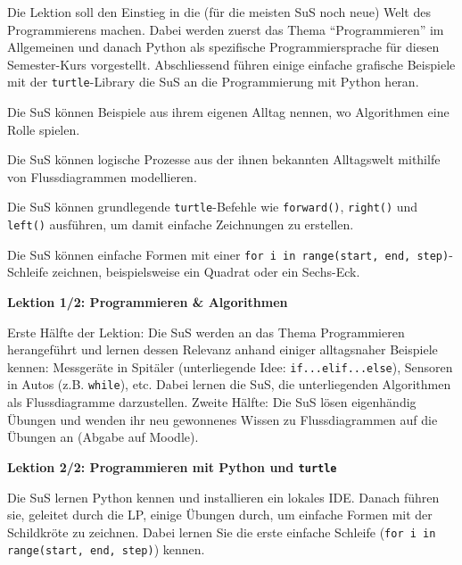 \begin{myExBox}
	Die Lektion soll den Einstieg in die (für die meisten SuS noch neue) Welt des Programmierens machen. Dabei werden zuerst das Thema \enquote{Programmieren} im Allgemeinen und danach Python als spezifische Programmiersprache für diesen Semester-Kurs vorgestellt. Abschliessend führen einige einfache grafische Beispiele mit der \lstinline|turtle|-Library die SuS an die Programmierung mit Python heran.


	\begin{todolist}
		\item Die SuS können Beispiele aus ihrem eigenen Alltag nennen, wo Algorithmen eine Rolle spielen.
		\item Die SuS können logische Prozesse aus der ihnen bekannten Alltagswelt mithilfe von Flussdiagrammen modellieren.
		\item Die SuS können grundlegende \lstinline|turtle|-Befehle wie \lstinline|forward()|, \lstinline|right()| und \lstinline|left()| ausführen, um damit einfache Zeichnungen zu erstellen.
		\item Die SuS können einfache Formen mit einer \lstinline|for i in range(start, end, step)|-Schleife zeichnen, beispielsweise ein Quadrat oder ein Sechs-Eck.
	\end{todolist}

	\textbf{Lektion 1/2: Programmieren \& Algorithmen}

	Erste Hälfte der Lektion: Die SuS werden an das Thema Programmieren herangeführt und lernen dessen Relevanz anhand einiger alltagsnaher Beispiele kennen: Messgeräte in Spitäler (unterliegende Idee: \lstinline|if...elif...else|), Sensoren in Autos (z.B. \lstinline|while|), etc. Dabei lernen die SuS, die unterliegenden Algorithmen als Flussdiagramme darzustellen. Zweite Hälfte: Die SuS lösen eigenhändig Übungen und wenden ihr neu gewonnenes Wissen zu Flussdiagrammen auf die Übungen an (Abgabe auf Moodle).

	\textbf{Lektion 2/2: Programmieren mit Python und \lstinline|turtle|}

	Die SuS lernen Python kennen und installieren ein lokales IDE. Danach führen sie, geleitet durch die LP, einige Übungen durch, um einfache Formen mit der Schildkröte zu zeichnen. Dabei lernen Sie die erste einfache Schleife (\lstinline|for i in range(start, end, step)|) kennen.


\end{myExBox}
